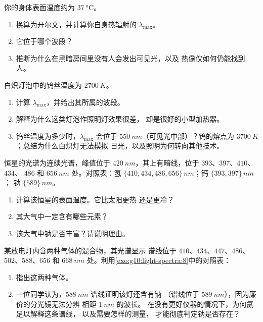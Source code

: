 \begin{exercise}[$\star\star$]\label{exo:g10:light-spectra:11}
你的身体表面温度约为 $\qty{37}{\degreeCelsius}$。
\begin{enumerate}
  \item 换算为开尔文，并计算你自身热辐射的
        $\lambda_{\max}$。
  \item 它位于哪个波段？
  \item 推断为什么在黑暗房间里没有人会发出可见光，以及
        热像仪如何仍能找到人。
\end{enumerate}
\end{exercise}

\begin{exercise}[$\star\star\star$]\label{exo:g10:light-spectra:12}
白炽灯泡中的钨丝温度为 $\qty{2700}{K}$。
\begin{enumerate}
  \item 计算 $\lambda_{\max}$，并给出其所属的波段。
  \item 解释为什么这类灯泡作照明灯效果很差，
        却是很好的小型加热器。
  \item 钨丝温度为多少时，$\lambda_{\max}$ 会位于
        $\qty{550}{nm}$（可见光中部）？钨的熔点为
        $\qty{3700}{K}$；总结为什么白炽灯无法模拟
        日光，以及照明为何转向其他技术。
\end{enumerate}
\end{exercise}

\begin{exercise}[$\star\star\star$]\label{exo:g10:light-spectra:13}
恒星的光谱为连续光谱，峰值位于
$\qty{420}{nm}$，其上有暗线，位于 $393$、$397$、$410$、$434$、
$486$ 和 $\qty{656}{nm}$ 处。对照表：氢
$\{410, 434, 486, 656\}\,\unit{nm}$；钙 $\{393, 397\}\,\unit{nm}$；
钠 $\{589\}\,\unit{nm}$。
\begin{enumerate}
  \item 计算该恒星的表面温度。它比太阳更热
        还是更冷？
  \item 其大气中一定含有哪些元素？
  \item 该大气中钠是否丰富？请说明理由。
\end{enumerate}
\end{exercise}

\begin{exercise}[$\star\star\star$]\label{exo:g10:light-spectra:14}
某放电灯内含两种气体的混合物，其光谱显示
谱线位于 $410$、$434$、$447$、$486$、$502$、$588$、$656$ 和
$\qty{668}{nm}$ 处。利用\cref{exo:g10:light-spectra:8}中的对照表：
\begin{enumerate}
  \item 指出这两种气体。
  \item 一位同学认为，$\qty{588}{nm}$ 谱线证明该灯还含有钠
        （谱线位于 $\qty{589}{nm}$），因为廉价的分光镜无法分辨
        相距 $\qty{1}{nm}$ 的波长。
        在没有更好仪器的情况下，为何氦足以解释这条谱线，
        以及需要怎样的测量，
        才能彻底判定钠是否存在？
\end{enumerate}
\end{exercise}

